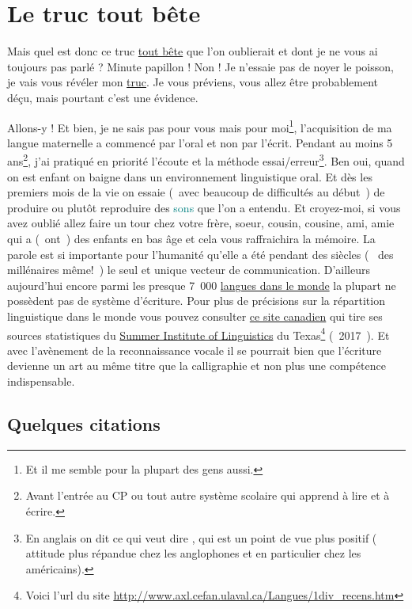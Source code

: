 \newpage
\section{Le truc tout bête}\label{sec:truc}
Mais quel est donc ce truc \underline{tout bête} que l'on oublierait et dont je
ne vous ai toujours pas parlé ? Minute papillon ! Non ! Je n'essaie
pas de noyer le poisson, je vais vous révéler mon \underline{truc}. Je vous
préviens, vous allez être probablement déçu, mais pourtant c'est une
évidence. \par
Allons-y ! Et bien, je ne sais pas pour vous mais pour moi\footnote{Et il me
semble pour la plupart des gens aussi.}, l'acquisition de ma langue
maternelle a commencé par l'oral et non par l'écrit. Pendant au moins
5 ans\footnote{Avant l'entrée au CP ou tout autre système scolaire qui
apprend à lire et à écrire.}, j'ai pratiqué en priorité l'écoute et la
méthode essai/erreur\footnote{En anglais on dit  ce qui veut
dire , qui est un point de vue plus positif (
attitude plus répandue chez les anglophones et en particulier chez les américains).}. Ben
oui, quand on est enfant on baigne dans un environnement linguistique
oral. Et dès les premiers mois de la vie on essaie (~avec beaucoup de
difficultés au début~) de produire ou plutôt reproduire des \textcolor{teal}{sons} que
l'on a entendu. Et croyez-moi, si vous avez oublié allez faire un tour
chez votre frère, soeur, cousin, cousine, ami, amie qui a (~ont~) des
enfants en bas âge et cela vous raffraichira la mémoire. La parole est
si importante pour l'humanité qu'elle a été pendant des siècles (~ des
millénaires même!~) le seul et unique vecteur de
communication. D'ailleurs aujourd'hui encore parmi les presque 7~000
\href{http://www.museedelhomme.fr/fr/combien-langues-sont-parlees-monde}{langues dans le monde} la plupart ne possèdent pas de système
d'écriture. Pour plus de précisions sur la répartition linguistique
dans le monde vous pouvez consulter \href{http://www.axl.cefan.ulaval.ca/Langues/1div\_recens.htm}{ce site canadien} qui tire ses
sources statistiques du \underline{Summer Institute of Linguistics} du
Texas\footnote{Voici l'url du site
  \url{http://www.axl.cefan.ulaval.ca/Langues/1div_recens.htm}}
(~2017~). Et avec l'avènement de la reconnaissance vocale il se
pourrait bien que l'écriture devienne un art au même titre que la
calligraphie et non plus une compétence indispensable.

\newpage

\subsection{Quelques citations}\label{subsec:quote}

